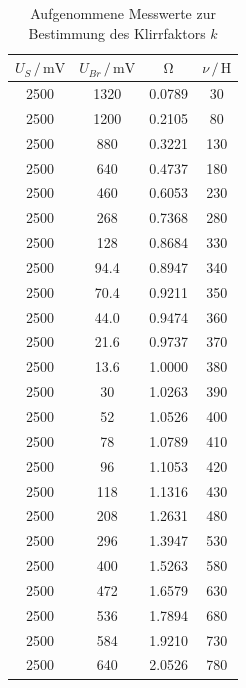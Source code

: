 \begin{table}[H]
\normalsize
\centering
{}
\begin{tabular}{c c c c}
\toprule
        $U_{S} \,/\,\si{\milli\volt}$ & $U_{Br} \,/\,\si{\milli\volt}$ & $\upOmega$ & $\nu \,/\, \si{\henry}$ \\
        \midrule
        2500 & 1320 &           0.0789 & 30 \\
        2500 & 1200 &           0.2105 & 80 \\
        2500 & 880 &            0.3221 & 130 \\
        2500 & 640 &            0.4737 & 180 \\
        2500 & 460 &            0.6053 & 230 \\
        2500 & 268 &            0.7368 & 280 \\
        2500 & 128 &            0.8684 & 330 \\
        2500 & 94.4 &           0.8947 & 340 \\
        2500 & 70.4 &           0.9211 & 350 \\
        2500 & 44.0 &           0.9474 & 360 \\
        2500 & 21.6 &           0.9737 & 370 \\
        2500 & 13.6 &           1.0000 & 380 \\   
        2500 & 30 &             1.0263 & 390 \\
        2500 & 52 &             1.0526 & 400 \\
        2500 & 78 &             1.0789 & 410 \\
        2500 & 96 &             1.1053 & 420 \\
        2500 & 118 &            1.1316 & 430 \\
        2500 & 208 &            1.2631 & 480 \\
        2500 & 296 &            1.3947 & 530 \\
        2500 & 400 &            1.5263 & 580 \\
        2500 & 472 &            1.6579 & 630 \\
        2500 & 536 &            1.7894 & 680 \\
        2500 & 584 &            1.9210 & 730 \\
        2500 & 640 &            2.0526 & 780 \\
        
\bottomrule
\end{tabular}
\caption{Aufgenommene Messwerte zur Bestimmung des Klirrfaktors $k$} 
\label{tab:7}
\end{table}


